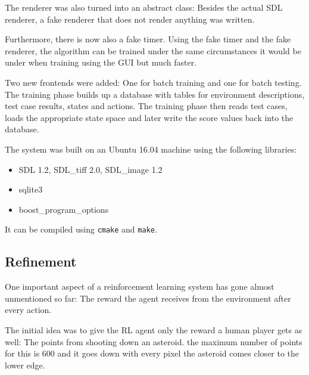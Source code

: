 \documentclass[a4paper,10pt]{article}
\begin{document}
The renderer was also turned into an abstract class:
Besides the actual SDL renderer, a fake renderer that does not render anything was written.

Furthermore, there is now also a fake timer.
Using the fake timer and the fake renderer, the algorithm can be trained under the same circumstances it would be under when training using the GUI but much faster.

Two new frontends were added: One for batch training and one for batch testing.
The training phase builds up a database with tables for environment descriptions, test case results, states and actions.
The training phase then reads test cases, loads the appropriate state space and later write the score values back into the database.

The system was built on an Ubuntu 16.04 machine using the following libraries:
\begin{itemize}
 \item SDL 1.2, SDL\_tiff 2.0, SDL\_image 1.2
 \item sqlite3
 \item boost\_program\_options
\end{itemize}
It can be compiled using \texttt{cmake} and \texttt{make}.


\subsection{Refinement}

One important aspect of a reinforcement learning system has gone almost unmentioned so far: The reward the agent receives from the environment after every action.

The initial idea was to give the RL agent only the reward a human player gets as well: The points from shooting down an asteroid.
the maximum number of points for this is 600 and it goes down with every pixel the asteroid comes closer to the lower edge.
\end{document}
